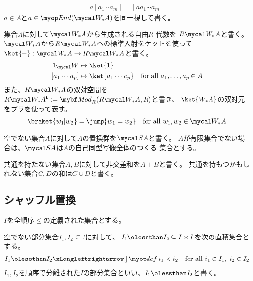 {\begin{description}
\begin{equation*}
\begin{split}
			a[a_1\cdots a_m] = [aa_1\cdots a_m]
		\end{split}\end{equation*}
		$a\in A$と$a\in \End(\W_*A)$を同一視して書く。
		\item[自由代数] 集合$A$に対して$\W_*A$から生成される自由$R$-代数を
		$R\W_*A$と書く。$\W_*A$から$R\W_*A$への標準入射をケットを使って
		$\ket{-}:\W_*A\to R\W_*A$と書く。
		\begin{equation*}\begin{split}
				1_\W &\mapsto \ket{1} \\
				[a_1\cdots a_p] &\mapsto \ket{a_1\cdots a_p}
				\quad\text{for all } a_1,\dots,a_p\in A
		\end{split}\end{equation*}
		また、$R\W_*A$の双対空間を$R\W_*A^\tran:=\Mod[R](R\W_*A,R)$と書き、
		$\ket{W_*A}$の双対元をブラを使って表す。
		\begin{equation*}\begin{split}
			\braket{w_1|w_2} = \jump{w_1 = w_2}
			\quad\text{for all } w_1,w_2\in \W_*A
		\end{split}\end{equation*}
		\item[置換群] 空でない集合$A$に対して$A$の置換群を$\Perm A$と書く。
		$A$が有限集合でない場合は、$\Perm A$は$A$の自己同型写像全体のつくる
		集合とする。
		\item[非交差和] 共通を持たない集合$A,B$に対して非交差和を$A+B$と書く。
		共通を持もつかもしれない集合$C,D$の和は$C\cup D$と書く。
	\end{description} %

\subsection{シャッフル置換}\label{s2:シャッフル置換} %
	$I$を全順序$\le$の定義された集合とする。

	\begin{definition}[順序で分離された部分集合]
	\label{def:順序で分離された部分集合} %
		空でない部分集合$I_1,I_2\subseteq I$に対して、
		$I_1\oless I_2\subseteq I\times I$を次の直積集合とする。
		\begin{equation*}\begin{split}
			I_1\oless I_2 \xiff{\dfn} 
				i_1 < i_2 \quad\text{for all } i_1\in I_1,\; i_2\in I_2
		\end{split}\end{equation*}
		$I_1,I_2$を順序で分離された$I$の部分集合といい、$I_1\oless I_2$と書く。
	\end{definition} %

}
